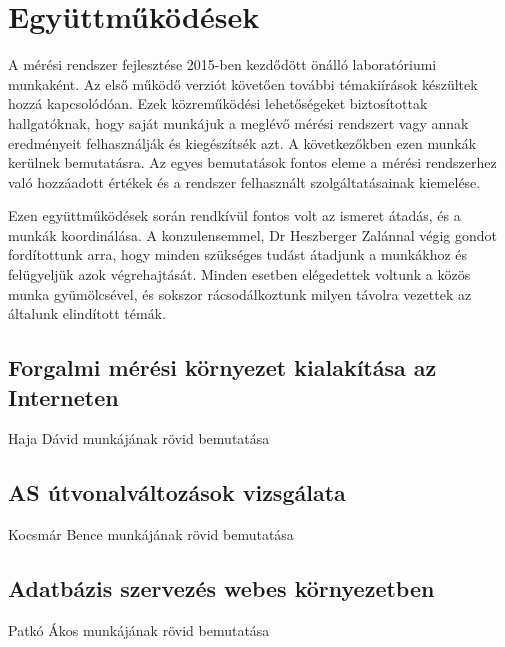 \chapter{Együttműködések}

A mérési rendszer fejlesztése 2015-ben kezdődött önálló laboratóriumi munkaként. Az első működő verziót követően további témakiírások készültek hozzá kapcsolódóan. Ezek közreműködési lehetőségeket biztosítottak hallgatóknak, hogy saját munkájuk a meglévő mérési rendszert vagy annak eredményeit felhasználják és kiegészítsék azt. A következőkben ezen munkák kerülnek bemutatásra. Az egyes bemutatások fontos eleme a mérési rendszerhez való hozzáadott értékek és a rendszer felhasznált szolgáltatásainak kiemelése.

Ezen együttműködések során rendkívül fontos volt az ismeret átadás, és a munkák koordinálása. A konzulensemmel, Dr Heszberger Zalánnal végig gondot fordítottunk arra, hogy minden szükséges tudást átadjunk a munkákhoz és felügyeljük azok végrehajtását. Minden esetben elégedettek voltunk a közös munka gyümölcsével, és sokszor rácsodálkoztunk milyen távolra vezettek az általunk elindított témák.

\section{Forgalmi mérési környezet kialakítása az Interneten}
Haja Dávid munkájának rövid bemutatása

\section{AS útvonalváltozások vizsgálata}
Kocsmár Bence munkájának rövid bemutatása

\section{Adatbázis szervezés webes környezetben}
Patkó Ákos munkájának rövid bemutatása